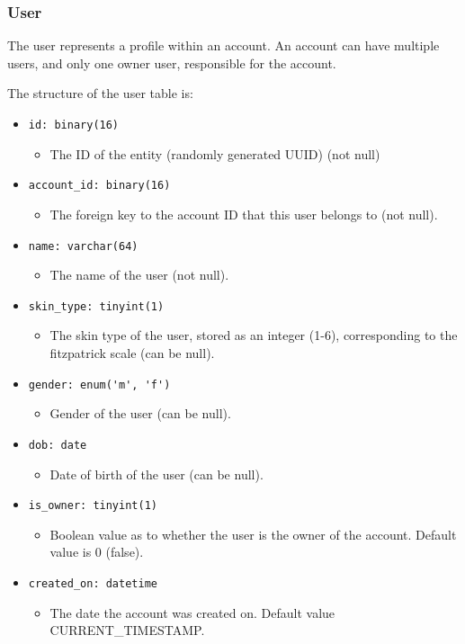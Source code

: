 \documentclass[12pt,openany,a4paper]{book}
\begin{document}
\subsubsection{User}

The user represents a profile within an account. An account can have multiple
users, and only one owner user, responsible for the account.

The structure of the user table is:

\begin{itemize}
	\item \verb|id: binary(16)|
	\begin{itemize}
		\item The ID of the entity (randomly generated UUID) (not null)
	\end{itemize}
	\item \verb|account_id: binary(16)|
	\begin{itemize}
		\item The foreign key to the account ID that this user belongs to (not null).
	\end{itemize}
	\item \verb|name: varchar(64)|
	\begin{itemize}
		\item The name of the user (not null).
	\end{itemize}
	\item \verb|skin_type: tinyint(1)|
	\begin{itemize}
		\item The skin type of the user, stored as an integer (1-6), corresponding
		to the fitzpatrick scale (can be null).
	\end{itemize}
	\item \verb|gender: enum('m', 'f')|
	\begin{itemize}
		\item Gender of the user (can be null).
	\end{itemize}
	\item \verb|dob: date|
	\begin{itemize}
		\item Date of birth of the user (can be null).
	\end{itemize}
	\item \verb|is_owner: tinyint(1)|
	\begin{itemize}
		\item Boolean value as to whether the user is the owner of the account.
		Default value is 0 (false).
	\end{itemize}
	\item \verb|created_on: datetime|
	\begin{itemize}
		\item The date the account was created on. Default value
		CURRENT\_TIMESTAMP.
	\end{itemize}
\end{itemize}
\end{document}
